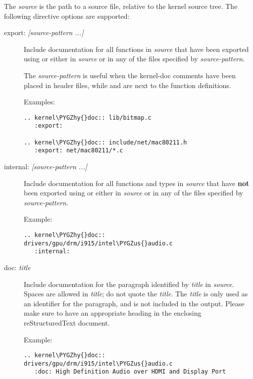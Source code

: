 \documentclass[a4paper,8pt,english]{sphinxmanual}
\def\PYGZus{\char`\_}
\def\PYGZhy{\char`\-}
\begin{document}
The \emph{source} is the path to a source file, relative to the kernel source
tree. The following directive options are supported:
\begin{description}
\item[{export: \emph{{[}source-pattern ...{]}}}] \leavevmode
Include documentation for all functions in \emph{source} that have been exported
using  or  either in \emph{source} or in any
of the files specified by \emph{source-pattern}.

The \emph{source-pattern} is useful when the kernel-doc comments have been placed
in header files, while  and  are next to
the function definitions.

Examples:

\begin{Verbatim}[commandchars=\\\{\}]
.. kernel\PYGZhy{}doc:: lib/bitmap.c
   :export:

.. kernel\PYGZhy{}doc:: include/net/mac80211.h
   :export: net/mac80211/*.c
\end{Verbatim}

\item[{internal: \emph{{[}source-pattern ...{]}}}] \leavevmode
Include documentation for all functions and types in \emph{source} that have
\textbf{not} been exported using  or  either
in \emph{source} or in any of the files specified by \emph{source-pattern}.

Example:

\begin{Verbatim}[commandchars=\\\{\}]
.. kernel\PYGZhy{}doc:: drivers/gpu/drm/i915/intel\PYGZus{}audio.c
   :internal:
\end{Verbatim}

\item[{doc: \emph{title}}] \leavevmode
Include documentation for the  paragraph identified by \emph{title} in
\emph{source}. Spaces are allowed in \emph{title}; do not quote the \emph{title}. The \emph{title}
is only used as an identifier for the paragraph, and is not included in the
output. Please make sure to have an appropriate heading in the enclosing
reStructuredText document.

Example:

\begin{Verbatim}[commandchars=\\\{\}]
.. kernel\PYGZhy{}doc:: drivers/gpu/drm/i915/intel\PYGZus{}audio.c
   :doc: High Definition Audio over HDMI and Display Port
\end{Verbatim}


\end{description}
\end{document}

